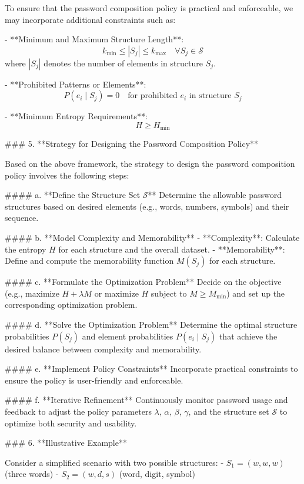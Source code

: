 To ensure that the password composition policy is practical and enforceable, we may incorporate additional constraints such as:

- **Minimum and Maximum Structure Length**:
  \[
  k_{\text{min}} \leq |S_j| \leq k_{\text{max}} \quad \forall S_j \in \mathcal{S}
  \]
  where \( |S_j| \) denotes the number of elements in structure \( S_j \).

- **Prohibited Patterns or Elements**:
  \[
  P(e_i \mid S_j) = 0 \quad \text{for prohibited } e_i \text{ in structure } S_j
  \]

- **Minimum Entropy Requirements**:
  \[
  H \geq H_{\text{min}}
  \]

### 5. **Strategy for Designing the Password Composition Policy**

Based on the above framework, the strategy to design the password composition policy involves the following steps:

#### a. **Define the Structure Set \( \mathcal{S} \)**
Determine the allowable password structures based on desired elements (e.g., words, numbers, symbols) and their sequence.

#### b. **Model Complexity and Memorability**
- **Complexity**: Calculate the entropy \( H \) for each structure and the overall dataset.
- **Memorability**: Define and compute the memorability function \( M(S_j) \) for each structure.

#### c. **Formulate the Optimization Problem**
Decide on the objective (e.g., maximize \( H + \lambda M \) or maximize \( H \) subject to \( M \geq M_{\text{min}} \)) and set up the corresponding optimization problem.

#### d. **Solve the Optimization Problem**
Determine the optimal structure probabilities \( P(S_j) \) and element probabilities \( P(e_i \mid S_j) \) that achieve the desired balance between complexity and memorability.

#### e. **Implement Policy Constraints**
Incorporate practical constraints to ensure the policy is user-friendly and enforceable.

#### f. **Iterative Refinement**
Continuously monitor password usage and feedback to adjust the policy parameters \( \lambda \), \( \alpha \), \( \beta \), \( \gamma \), and the structure set \( \mathcal{S} \) to optimize both security and usability.

### 6. **Illustrative Example**

Consider a simplified scenario with two possible structures:
- \( S_1 = (w, w, w) \) (three words)
- \( S_2 = (w, d, s) \) (word, digit, symbol)

